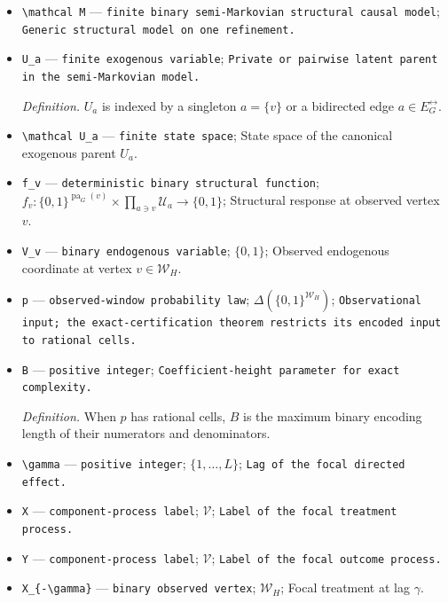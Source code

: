 \documentclass{article}
\begin{document}
\begin{itemize}
  \item \texttt{\textbackslash{}\allowbreak{}mathcal M} --- \texttt{finite binary semi-\allowbreak{}Markovian structural causal model}; \texttt{Generic structural model on one refinement.}
  \item \texttt{U\_\allowbreak{}a} --- \texttt{finite exogenous variable}; \texttt{Private or pairwise latent parent in the semi-\allowbreak{}Markovian model.}
  \par\smallskip\noindent\emph{Definition.} \(U_a\) is indexed by a singleton \(a=\{v\}\) or a bidirected edge \(a\in E_G^{\leftrightarrow}\).
  \item \texttt{\textbackslash{}\allowbreak{}mathcal U\_\allowbreak{}a} --- \texttt{finite state space}; State space of the canonical exogenous parent \(U_a\).
  \item \texttt{f\_\allowbreak{}v} --- \texttt{deterministic binary structural function}; \(f_v:\{0,1\}^{\operatorname{pa}_G(v)}\times\prod_{a\ni v}\mathcal U_a\to\{0,1\}\); Structural response at observed vertex \(v\).
  \item \texttt{V\_\allowbreak{}v} --- \texttt{binary endogenous variable}; \(\{0,1\}\); Observed endogenous coordinate at vertex \(v\in\mathcal W_H\).
  \item \texttt{p} --- \texttt{observed-\allowbreak{}window probability law}; \(\Delta(\{0,1\}^{\mathcal W_H})\); \texttt{Observational input;\allowbreak{} the exact-\allowbreak{}certification theorem restricts its encoded input to rational cells.}
  \item \texttt{B} --- \texttt{positive integer}; \texttt{Coefficient-\allowbreak{}height parameter for exact complexity.}
  \par\smallskip\noindent\emph{Definition.} When \(p\) has rational cells, \(B\) is the maximum binary encoding length of their numerators and denominators.
  \item \texttt{\textbackslash{}\allowbreak{}gamma} --- \texttt{positive integer}; \(\{1,\ldots,L\}\); \texttt{Lag of the focal directed effect.}
  \item \texttt{X} --- \texttt{component-\allowbreak{}process label}; \(\mathcal V\); \texttt{Label of the focal treatment process.}
  \item \texttt{Y} --- \texttt{component-\allowbreak{}process label}; \(\mathcal V\); \texttt{Label of the focal outcome process.}
  \item \texttt{X\_\allowbreak{}\{-\allowbreak{}\textbackslash{}\allowbreak{}gamma\}\allowbreak{}} --- \texttt{binary observed vertex}; \(\mathcal W_H\); Focal treatment at lag \(\gamma\).

\end{itemize}
\end{document}
